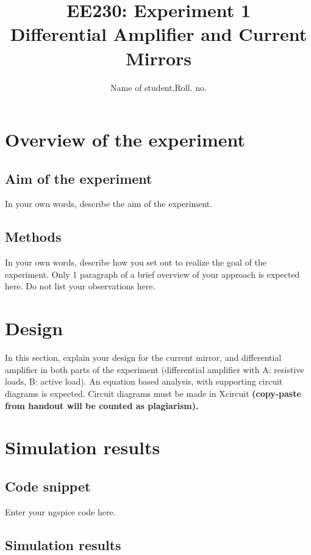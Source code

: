 \documentclass[12pt]{article}
\title{EE230: Experiment 1\\
Differential Amplifier and Current Mirrors}
\author{Name of student,Roll. no.}
\begin{document}
\maketitle

\section{Overview of the experiment}

\subsection{Aim of the experiment}

In your own words, describe the aim of the experiment.

\subsection{Methods}

In your own words, describe how you set out to realize the goal of the experiment. Only 1 paragraph of a brief overview of your approach is expected here. Do not list your observations here.

\section{Design}

In this section, explain your design for the current mirror, and differential amplifier in both parts of the experiment (differential amplifier with A: resistive loads, B: active load). An equation based analysis, with supporting circuit diagrams is expected. Circuit diagrams must be made in Xcircuit \textbf{(copy-paste from handout will be counted as plagiarism).}

\section{Simulation results}

\subsection{Code snippet}

Enter your ngspice code here.

\subsection{Simulation results}
\end{document}
